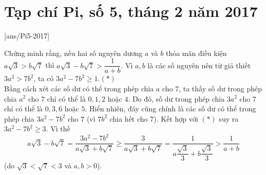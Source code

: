 \section{Tạp chí Pi, số 5,  tháng 2 năm 2017}
[ans/Pi5-2017]
\begin{bt}%
Chứng minh rằng, nếu hai số nguyên dương $a$ và $b$ thỏa mãn điều kiện $a\sqrt{3} >b \sqrt{7}$ thì $a\sqrt{3}-b\sqrt{7} >\dfrac{1}{a+b}.$
\loigiai
{
Vì $a,b$ là các số nguyên nên từ giả thiết $3a^2>7b^2$, ta có $3a^2-7b^2 \geq 1$.\hfill$(*)$\\
Bằng cách xét các số dư có thể trong phép chia $a$ cho $7$, ta thấy số dư trong phép chia $a^2$ cho $7$ chỉ có thể là $0,1,2$ hoặc $4$. Do đó, số dư trong phép chia $3a^2$ cho $7$ chỉ có thể là $0,3,6$ hoặc $5$. Hiển nhiên, đây cũng chính là các số dư có thể trong phép chia $3a^2-7b^2$ cho $7$ (vì $7b^2$ chia hết cho $7$). Kết hợp với  $(*)$ suy ra $3a^2-7b^2 \geq 3$. Vì thế 
$$
a\sqrt{3} -b\sqrt{7} = \dfrac{3a^2-7b^2}{a\sqrt{3}+b\sqrt{7}} \geq \dfrac{3}{a\sqrt{3}+b\sqrt{7}} 
=\dfrac{1}{a\dfrac{\sqrt{3}}{3} + b\dfrac{\sqrt{3}}{3}} > \dfrac{1}{a+b}
$$
(do $\sqrt{3} <\sqrt{7} <3$ và $a,b>0$).
}
\end{bt}


